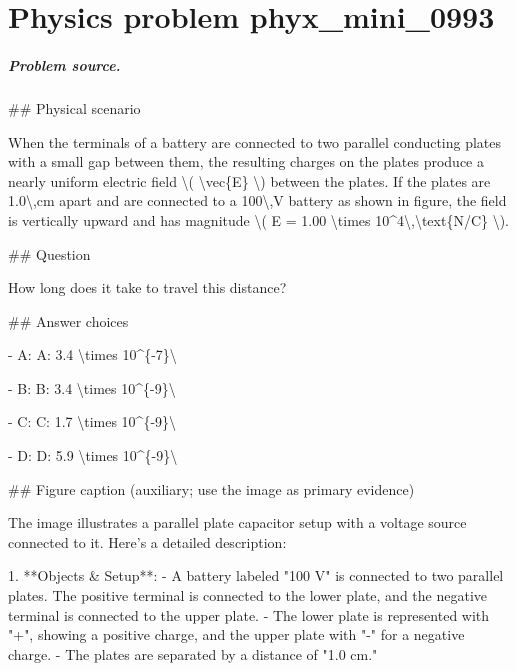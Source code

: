 
\chapter{Physics problem phyx\_mini\_0993}
\label{ch:PhyXMiniProblems_problem_phyx_mini_0993}

\paragraph{Problem source.}
\#\# Physical scenario

When the terminals of a battery are connected to two parallel conducting plates with a small gap between them, the resulting charges on the plates produce a nearly uniform electric field \textbackslash{}( \textbackslash{}vec\{E\} \textbackslash{}) between the plates. If the plates are 1.0\textbackslash{},cm apart and are connected to a 100\textbackslash{},V battery as shown in figure, the field is vertically upward and has magnitude \textbackslash{}( E = 1.00 \textbackslash{}times 10\textasciicircum{}4\textbackslash{},\textbackslash{}text\{N/C\} \textbackslash{}).

\#\# Question

How long does it take to travel this distance?

\#\# Answer choices

- A: A: 3.4 \textbackslash{}times 10\textasciicircum{}\{-7\}\textbackslash{}

- B: B: 3.4 \textbackslash{}times 10\textasciicircum{}\{-9\}\textbackslash{}

- C: C: 1.7 \textbackslash{}times 10\textasciicircum{}\{-9\}\textbackslash{}

- D: D: 5.9 \textbackslash{}times 10\textasciicircum{}\{-9\}\textbackslash{}

\#\# Figure caption (auxiliary; use the image as primary evidence)

The image illustrates a parallel plate capacitor setup with a voltage source connected to it. Here's a detailed description:

1. **Objects \& Setup**:
   - A battery labeled "100 V" is connected to two parallel plates. The positive terminal is connected to the lower plate, and the negative terminal is connected to the upper plate.
   - The lower plate is represented with "+", showing a positive charge, and the upper plate with "-" for a negative charge.
   - The plates are separated by a distance of "1.0 cm."

